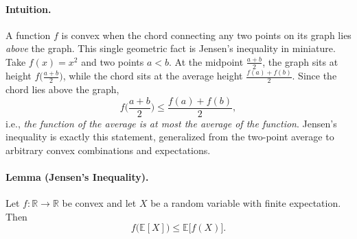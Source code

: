 \begin{nknote}
\paragraph{Intuition.}
A function $f$ is convex when the chord connecting any two points on its graph lies \emph{above} the graph. This single geometric fact is Jensen's inequality in miniature. Take $f(x) = x^2$ and two points $a < b$. At the midpoint $\frac{a+b}{2}$, the graph sits at height $f\big(\frac{a+b}{2}\big)$, while the chord sits at the average height $\frac{f(a)+f(b)}{2}$. Since the chord lies above the graph,
\[
f\Big(\frac{a+b}{2}\Big) \le \frac{f(a)+f(b)}{2},
\]
i.e., \emph{the function of the average is at most the average of the function}. Jensen's inequality is exactly this statement, generalized from the two-point average to arbitrary convex combinations and expectations.
\begin{center}
\end{center}

\paragraph{Lemma (Jensen's Inequality).}
Let $f \colon \mathbb{R} \to \mathbb{R}$ be convex and let $X$ be a random variable with finite expectation. Then
\[
f\big(\mathbb{E}[X]\big) \le \mathbb{E}\big[f(X)\big].
\]


\end{nknote}
